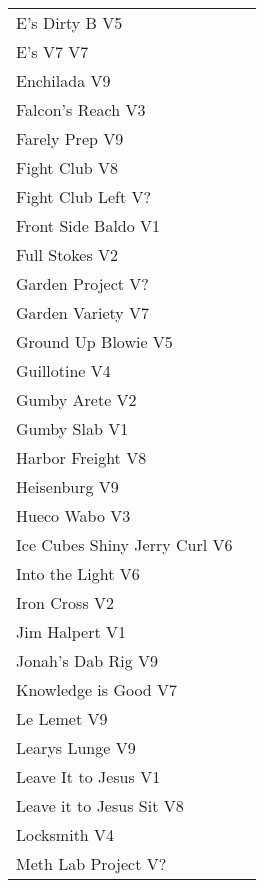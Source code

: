 \begin{center}
\begin{supertabular}{lr}
E's Dirty B V5 & \pageref{rt:E's Dirty B} \\
E's V7 V7 & \pageref{rt:E's V7} \\
Enchilada V9 & \pageref{rt:Enchilada} \\
Falcon's Reach V3 & \pageref{rt:Falcon's Reach} \\
Farely Prep V9 & \pageref{rt:Farely Prep} \\
Fight Club V8 & \pageref{rt:Fight Club} \\
Fight Club Left V? & \pageref{rt:Fight Club Left} \\
Front Side Baldo V1 & \pageref{rt:Front Side Baldo} \\
Full Stokes V2 & \pageref{rt:Full Stokes} \\
Garden Project V? & \pageref{rt:Garden Project} \\
Garden Variety V7 & \pageref{rt:Garden Variety} \\
Ground Up Blowie V5 & \pageref{rt:Ground Up Blowie} \\
Guillotine V4 & \pageref{rt:Guillotine} \\
Gumby Arete V2 & \pageref{rt:Gumby Arete} \\
Gumby Slab V1 & \pageref{rt:Gumby Slab} \\
Harbor Freight V8 & \pageref{vr:Harbor Freight} \\
Heisenburg V9 & \pageref{rt:Heisenburg} \\
Hueco Wabo V3 & \pageref{rt:Hueco Wabo} \\
Ice Cubes Shiny Jerry Curl V6 & \pageref{rt:Ice Cubes Shiny Jerry Curl} \\
Into the Light V6 & \pageref{rt:Into the Light} \\
Iron Cross V2 & \pageref{vr:Iron Cross} \\
Jim Halpert V1 & \pageref{rt:Jim Halpert} \\
Jonah's Dab Rig V9 & \pageref{rt:Jonah's Dab Rig} \\
Knowledge is Good V7 & \pageref{rt:Knowledge is Good} \\
Le Lemet V9 & \pageref{rt:Le Lemet} \\
Learys Lunge V9 & \pageref{rt:Learys Lunge} \\
Leave It to Jesus V1 & \pageref{rt:Leave It to Jesus} \\
Leave it to Jesus Sit V8 & \pageref{vr:Leave it to Jesus Sit} \\
Locksmith V4 & \pageref{rt:Locksmith} \\
Meth Lab Project V? & \pageref{rt:Meth Lab Project} \\

\end{supertabular}
\end{center}
